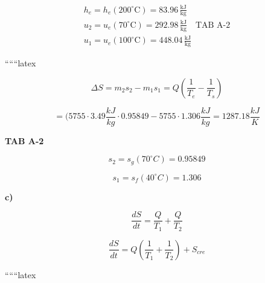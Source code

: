 \begin{align*}
h_e = h_e (200^\circ \text{C}) = 83.96 \, \frac{\text{kJ}}{\text{kg}} \\
u_2 = u_e (70^\circ \text{C}) = 292.98 \, \frac{\text{kJ}}{\text{kg}} \quad \text{TAB A-2} \\
u_1 = u_e (100^\circ \text{C}) = 448.04 \, \frac{\text{kJ}}{\text{kg}}
\end{align*}

``````latex

\begin{equation}
\Delta S = m_{2} s_{2} - m_{1} s_{1} = Q \left( \frac{1}{T_{e}} - \frac{1}{T_{s}} \right)
\end{equation}

\begin{equation}
= (5755 \cdot 3.49 \frac{kJ}{kg} \cdot 0.95849 - 5755 \cdot 1.306 \frac{kJ}{kg} = 1287.18 \frac{kJ}{K}
\end{equation}

\textbf{TAB A-2}

\begin{equation}
s_{2} = s_{g}(70^{\circ}C) = 0.95849
\end{equation}

\begin{equation}
s_{1} = s_{f}(40^{\circ}C) = 1.306
\end{equation}

\textbf{c)}

\begin{equation}
\frac{dS}{dt} = \frac{Q}{T_{1}} + \frac{Q}{T_{2}}
\end{equation}

\begin{equation}
\frac{dS}{dt} = Q \left( \frac{1}{T_{1}} + \frac{1}{T_{2}} \right) + S_{cre}
\end{equation}

``````latex


